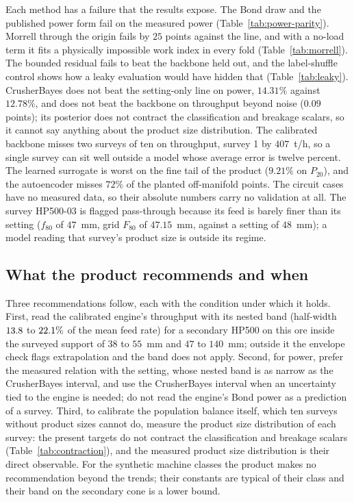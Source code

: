 Each method has a failure that the results expose. The Bond draw and the published power form fail on the measured power (Table~\ref{tab:power-parity}).
Morrell through the origin fails by $25$ points against the line, and with a no-load term it fits a physically impossible work index in every fold
(Table~\ref{tab:morrell}). The bounded residual fails to beat the backbone held out, and the label-shuffle control shows how a leaky evaluation would
have hidden that (Table~\ref{tab:leaky}). CrusherBayes does not beat the setting-only line on power, $14.31\%$ against $12.78\%$, and does not beat the
backbone on throughput beyond noise ($0.09$ points); its posterior does not contract the classification and breakage scalars, so it cannot say
anything about the product size distribution. The calibrated backbone misses two surveys of ten on throughput, survey 1 by $407$~t/h, so a single
survey can sit well outside a model whose average error is twelve percent. The learned surrogate is worst on the fine tail of the product
($9.21\%$ on $P_{20}$), and the autoencoder misses $72\%$ of the planted off-manifold points. The circuit cases have no measured data, so their absolute
numbers carry no validation at all. The survey HP500-03 is flagged pass-through because its feed is barely finer than its setting ($f_{80}$ of $47$~mm, grid $F_{80}$ of
$47.15$~mm, against a setting of $48$~mm); a model reading that survey's product size is outside its regime.

\subsection{What the product recommends and when}\label{sec:disc-recommend}

Three recommendations follow, each with the condition under which it holds. First, read the calibrated engine's throughput with its nested band
(half-width $13.8$ to $22.1\%$ of the mean feed rate) for a secondary HP500 on this ore inside the surveyed support of $38$ to $55$~mm and $47$ to $140$~mm; outside it the envelope check
flags extrapolation and the band does not apply. Second, for power, prefer the measured relation with the setting, whose nested band is as narrow as the CrusherBayes interval, and use the
CrusherBayes interval when an uncertainty tied to the engine is needed; do not read the engine's
Bond power as a prediction of a survey. Third, to calibrate the population balance itself, which ten surveys without product sizes cannot do,
measure the product size distribution of each survey: the present targets do not contract the classification and breakage scalars
(Table~\ref{tab:contraction}), and the measured product size distribution is their direct observable. For the synthetic machine classes the product makes no recommendation beyond the trends; their constants are
typical of their class and their band on the secondary cone is a lower bound.


